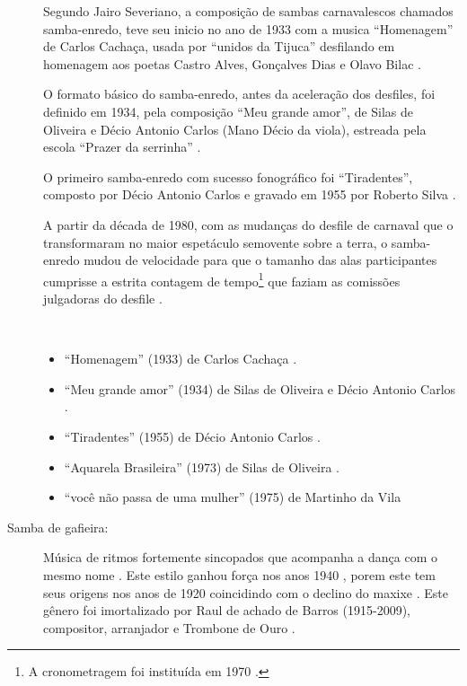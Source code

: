 \begin{description}
Segundo Jairo Severiano, a composição de sambas carnavalescos chamados samba-enredo,
teve seu inicio no ano de 1933 com a musica ``Homenagem'' de Carlos Cachaça, usada por ``unidos da Tijuca''
desfilando em homenagem aos poetas Castro Alves, Gonçalves Dias e Olavo Bilac  \cite{rizzi2016musica}.

O formato básico do samba-enredo, antes da aceleração dos desfiles, foi definido em 1934, 
pela composição ``Meu grande amor'', 
de Silas de Oliveira e Décio Antonio Carlos (Mano Décio da viola), 
estreada pela escola ``Prazer da serrinha'' \cite[pp. 85-86]{de2003tem}.

O primeiro samba-enredo com sucesso fonográfico foi ``Tiradentes'', 
 composto por Décio Antonio Carlos e gravado em 1955 por Roberto Silva  \cite[pp. 86]{de2003tem}. 

A partir da década de 1980, 
com as mudanças do desfile de carnaval que o transformaram no maior espetáculo semovente sobre a terra, 
o samba-enredo mudou de velocidade para que o tamanho das alas participantes cumprisse 
a estrita contagem de tempo\footnote{A cronometragem foi instituída em 1970  \cite{rizzi2016musica}.} 
que faziam as comissões julgadoras do desfile \cite[pp. 88]{de2003tem} \cite{rizzi2016musica}.
\begin{example} ~

\begin{itemize}
\item ``Homenagem'' (1933) de Carlos Cachaça \cite{rizzi2016musica}.
\item ``Meu grande amor'' (1934) de Silas de Oliveira e Décio Antonio Carlos \cite[pp. 84-85]{de2003tem}.
\item ``Tiradentes'' (1955) de Décio Antonio Carlos  \cite[pp. 86]{de2003tem}.
\item ``Aquarela Brasileira'' (1973) de Silas de Oliveira \cite[pp. 123]{de2003tem} \cite[pp. 253]{diniz2006almanaque}.
\item ``você não passa de uma mulher'' (1975) de Martinho da Vila \cite{martinhodavila} \cite[pp. 185]{diniz2006almanaque}
\end{itemize}
\end{example}


\item[Samba de gafieira:] 
Música de ritmos fortemente sincopados que acompanha a dança com o mesmo nome \cite[pp. 291]{dourado2004dicionario}.
Este estilo ganhou força nos anos 1940 \cite[pp. 142]{perna2002samba} \cite[pp. 291]{dourado2004dicionario},
porem este tem seus origens nos anos de 1920 coincidindo com o declino do maxixe \cite[pp. 63]{reinato2010musica}.
Este gênero foi imortalizado por Raul de achado de Barros (1915-2009), 
compositor, arranjador e Trombone de Ouro \cite[pp. 63]{reinato2010musica}.


\end{description}
